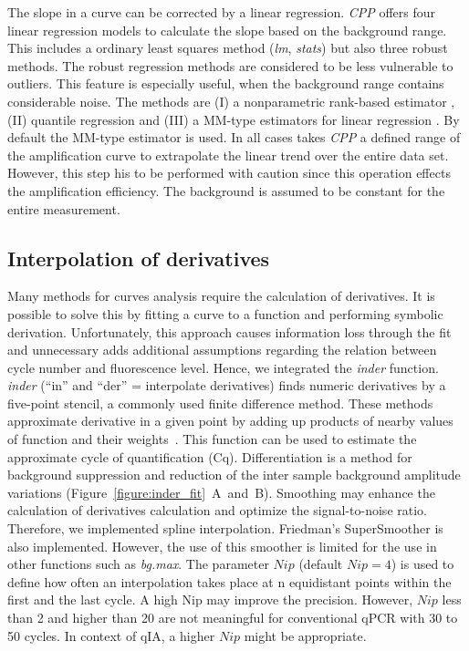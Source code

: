 \documentclass[twocolumn]{bmcart}%
\begin{document}
  The slope in a curve can be corrected by a linear regression. \textsl{CPP} 
offers four linear regression models to calculate the slope based on the 
background range. This includes a ordinary least squares method (\textsl{lm}, 
\emph{stats}) but also three robust methods. The robust regression methods are 
considered to be less vulnerable to outliers. This feature is especially useful, 
when the background range contains considerable noise. The methods are (I) a 
nonparametric rank-based estimator \cite{Kloke_2012}, (II) quantile regression 
\cite{Koenker_2008} and (III) a MM-type estimators for linear regression 
\cite{Todorov_2009}. By default the MM-type estimator is used. In all cases 
takes \textsl{CPP} a defined range of the amplification curve to extrapolate the 
linear trend over the entire data set. However, this step his to be performed 
with caution since this operation effects the amplification efficiency. The 
background is assumed to be constant for the entire measurement. 

\subsection*{Interpolation of derivatives}
 
  Many methods for curves analysis require the calculation of derivatives. It 
is 
possible to solve this by fitting a curve to a function and performing symbolic 
derivation. Unfortunately, this approach causes information loss through the 
fit 
and unnecessary adds additional assumptions regarding the relation between 
cycle number and fluorescence level. Hence, we integrated the \textsl{inder} 
function. \textsl{inder} (``in'' and ``der'' = interpolate derivatives) finds 
numeric derivatives by a five-point stencil, a commonly used finite difference 
method. These methods approximate derivative in a given point by adding up 
products of nearby values of function and their weights~\cite{Dahlquist_2008}. 
This function can be used to estimate the approximate cycle of quantification 
(Cq). Differentiation is a method for background suppression and reduction of 
the inter sample background amplitude variations 
(Figure~\ref{figure:inder_fit}~A~and~B). Smoothing may enhance the calculation 
of derivatives calculation and optimize the signal-to-noise ratio. Therefore, 
we 
implemented spline interpolation. Friedman's SuperSmoother is also implemented. 
However, the use of this smoother is limited for the use in other functions 
such 
as \textsl{bg.max}. The parameter $Nip$ (default $Nip = 4$) is used to define 
how often an interpolation takes place at n equidistant points within the first 
and the last cycle. A high Nip may improve the precision. However, $Nip$ less 
than 2 and higher than 20 are not meaningful for conventional qPCR with 30 to 
50 
cycles. In context of qIA, a higher $Nip$ might be appropriate.
\end{document}
